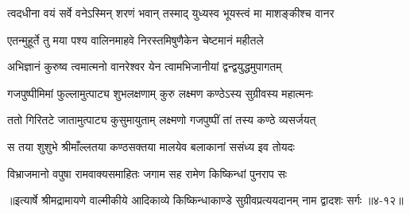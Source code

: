 \twolineshloka
{त्वदधीना वयं सर्वे वनेऽस्मिन् शरणं भवान्}
{तस्माद् युध्यस्व भूयस्त्वं मा माशङ्कीश्च वानर} %

\twolineshloka
{एतन्मुहूर्ते तु मया पश्य वालिनमाहवे}
{निरस्तमिषुणैकेन चेष्टमानं महीतले} %

\twolineshloka
{अभिज्ञानं कुरुष्व त्वमात्मनो वानरेश्वर}
{येन त्वामभिजानीयां द्वन्द्वयुद्धमुपागतम्} %

\twolineshloka
{गजपुष्पीमिमां फुल्लामुत्पाट्य शुभलक्षणाम्}
{कुरु लक्ष्मण कण्ठेऽस्य सुग्रीवस्य महात्मनः} %

\twolineshloka
{ततो गिरितटे जातामुत्पाट्य कुसुमायुताम्}
{लक्ष्मणो गजपुष्पीं तां तस्य कण्ठे व्यसर्जयत्} %

\twolineshloka
{स तया शुशुभे श्रीमाँल्लतया कण्ठसक्तया}
{मालयेव बलाकानां ससंध्य इव तोयदः} %

\twolineshloka
{विभ्राजमानो वपुषा रामवाक्यसमाहितः}
{जगाम सह रामेण किष्किन्धां पुनराप सः} %


॥इत्यार्षे श्रीमद्रामायणे वाल्मीकीये आदिकाव्ये किष्किन्धाकाण्डे सुग्रीवप्रत्ययदानम् नाम द्वादशः सर्गः ॥४-१२॥

